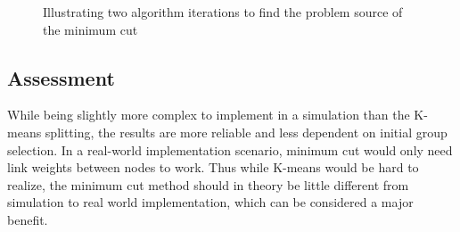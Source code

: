 \begin{figure}
	\centering
		\qquad
		\caption{Illustrating two algorithm iterations to find the problem source of the minimum cut}%
		\label{fig:mincutbug}%
\end{figure}




\subsection{Assessment}
While being slightly more complex to implement in a simulation than the K-means splitting, the results are more reliable and less dependent 
on initial group selection. In a real-world implementation scenario, minimum cut would only need link weights between nodes to work.
Thus while K-means would be hard to realize, the minimum cut method should in theory be little different from simulation to real world implementation, which can be considered
a major benefit. 


